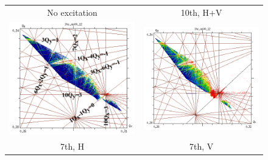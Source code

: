\documentclass[aps
,prstab
,reprint
,longbibliography
,preprintnumbers
,showkeys
,amsfonts,amssymb,amsmath
,floatfix
]{revtex4-1}
\newlength{\fmawidth}
\begin{document}
\begin{figure}
  \begin{tabular}{cc}
    No excitation & 10th, H+V \\
    \includegraphics[width=\fmawidth]{2016injnocolc15o+19_6noerru_dp0_ord10_annotate.png} &
    \includegraphics[width=\fmawidth]{2016injnocolc15o+19_6noerrut10skhv_dp0_ord10.png}
    \\
    7th, H & 7th, V \\

\end{tabular}
\end{figure}
\end{document}
